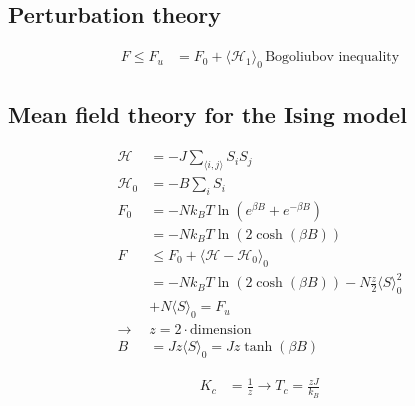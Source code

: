 \subsection*{Perturbation theory}
\[
    \begin{aligned}
        F \leq F_u &= F_0 + \langle \mathcal{H}_1 \rangle_0 \, \text{Bogoliubov inequality}
    \end{aligned}
\]

\subsection*{Mean field theory for the Ising model}
\[
    \begin{aligned}
        \mathcal{H} &= -J \sum_{\langle i,j \rangle} S_i S_j \\
        \mathcal{H}_0 &= -B \sum_i S_i \\
        F_0 &= -N k_B T \ln \left(e^{\beta B} + e^{-\beta B}\right) \\
            &= -N k_B T \ln (2 \cosh(\beta B)) \\
        F &\leq F_0 + \langle \mathcal{H} - \mathcal{H}_0 \rangle_0 \\
            &= -N k_B T \ln(2 \cosh(\beta B)) - N \frac{z}{2} \langle S \rangle_0^2 \\
            &+ N \langle S \rangle_0 = F_u\\
        \rightarrow & z = 2 \cdot \text{dimension} \\
        B &= J z \langle S \rangle_0 = Jz \tanh(\beta B) 
    \end{aligned}
\]

\[
    \begin{aligned}
        K_c &= \frac{1}{z} \rightarrow T_c = \frac{zJ}{k_B}
    \end{aligned}
\]